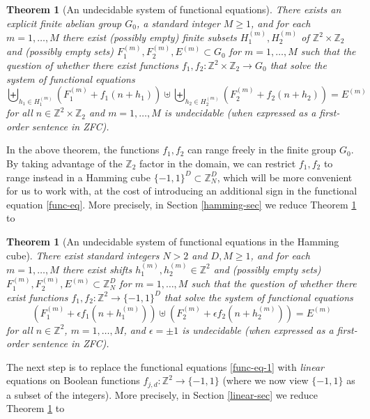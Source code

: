 \documentclass[reqno,a4paper,12pt]{amsart}
\numberwithin{equation}{section}
\numberwithin{figure}{section}
\def\Z{\mathbb{Z}}
\renewcommand\geq{\geqslant}
\theoremstyle{plain}
\newtheorem{theorem}[thm]{Theorem}
\theoremstyle{definition}
\begin{document}
\begin{theorem}[An undecidable system of functional equations]\label{main-function}  There exists an explicit finite abelian group $G_0$, a standard integer $M \geq 1$, and for each $m=1,\dots,M$ there exist (possibly empty) finite subsets $H_1^{(m)}, H_2^{(m)}$ of $\Z^2 \times \Z_2$ and (possibly empty sets) $F_1^{(m)}, F_2^{(m)}, E^{(m)} \subset G_0$ for $m=1,\dots,M$ such that the question of whether there exist  functions $f_1,f_2 \colon \Z^2 \times \Z_2 \to G_0$ that solve
the system of functional equations
\begin{equation}\label{func-eq}
\biguplus_{h_1 \in H_1^{(m)}} (F_1^{(m)} + f_1(n+h_1)) \uplus
\biguplus_{h_2 \in H_2^{(m)}} (F_2^{(m)} + f_2(n+h_2)) = E^{(m)}
\end{equation}
for all $n \in \Z^2\times \Z_2$ and $m=1,\dots,M$ is undecidable (when expressed as a first-order sentence in ZFC).
\end{theorem}

In the above theorem, the functions $f_1,f_2$ can range freely in the finite group $G_0$.  By taking advantage of the $\Z_2$ factor in the domain, we can restrict $f_1,f_2$ to range instead in a Hamming cube $\{-1,1\}^D \subset \Z_N^D$, which will be more convenient for us to work with, at the cost of introducing an additional sign in the functional equation \eqref{func-eq}.  More precisely, in Section \ref{hamming-sec} we reduce Theorem \ref{main-function} to

\begin{theorem}[An undecidable system of functional equations in the Hamming cube]\label{main-hamming}  There exist  standard integers $N > 2$ and $D,M \geq 1$, and for each $m=1,\dots,M$ there exist shifts $h_1^{(m)}, h_2^{(m)} \in \Z^2$ and (possibly empty sets) $F_1^{(m)}, F_2^{(m)}, E^{(m)} \subset \Z_N^D$ for $m=1,\dots,M$ such that the question of whether there exist functions $f_1,f_2 \colon \Z^2 \to \{-1,1\}^D$ that solve
the system of functional equations
\begin{equation}\label{func-eq-1}
(F_1^{(m)} + \epsilon f_1(n+h_1^{(m)})) \uplus
(F_2^{(m)} + \epsilon f_2(n+h_2^{(m)})) = E^{(m)}
\end{equation}
for all $n \in \Z^2$, $m=1,\dots,M$, and $\epsilon=\pm 1$ is undecidable (when expressed as a first-order sentence in ZFC).
\end{theorem}

The next step is to replace the functional equations \eqref{func-eq-1} with \emph{linear} equations on Boolean functions $f_{j,d} \colon \Z^2 \to \{-1,1\}$ (where we now view $\{-1,1\}$ as a subset of the integers).  More precisely, in Section \ref{linear-sec} we reduce Theorem \ref{main-hamming} to
\end{document}
